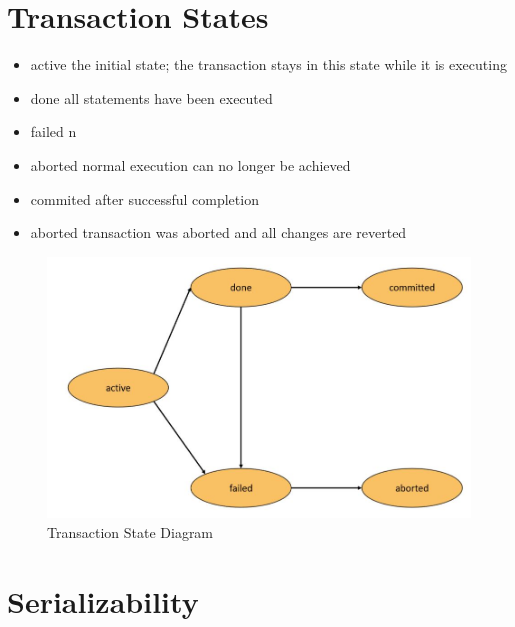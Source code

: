 	\section{Transaction States}
		\begin{itemize}
			\item active
				\subitem  the initial state; the transaction stays in this state while it is executing 
			\item done
				\subitem all statements have been executed
			\item failed 
				\subitem n
			\item aborted normal execution can no longer be achieved
			\item commited
				\subitem after successful completion
			\item aborted
				\subitem transaction was aborted and all changes are reverted
		\end{itemize}
			
		\begin{figure}[h!]
			\includegraphics[scale=0.5]{res/state-diagram-transaction.jpg}
			\caption{Transaction State Diagram}
		\end{figure}
	
	\section{Serializability}
		
		
		
		
		
		
			
		